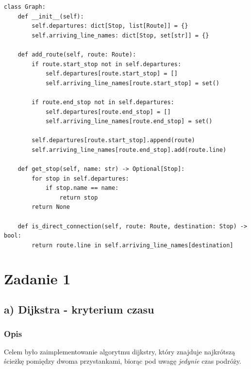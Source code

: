 \documentclass[a4paper, 12pt]{article}
\begin{document}
\begin{itemize}
\begin{lstlisting}
class Graph:
    def __init__(self):
        self.departures: dict[Stop, list[Route]] = {}
        self.arriving_line_names: dict[Stop, set[str]] = {}

    def add_route(self, route: Route):
        if route.start_stop not in self.departures:
            self.departures[route.start_stop] = []
            self.arriving_line_names[route.start_stop] = set()

        if route.end_stop not in self.departures:
            self.departures[route.end_stop] = []
            self.arriving_line_names[route.end_stop] = set()

        self.departures[route.start_stop].append(route)
        self.arriving_line_names[route.end_stop].add(route.line)

    def get_stop(self, name: str) -> Optional[Stop]:
        for stop in self.departures:
            if stop.name == name:
                return stop
        return None

    def is_direct_connection(self, route: Route, destination: Stop) -> bool:
        return route.line in self.arriving_line_names[destination]
\end{lstlisting}


    \end{itemize}



\section{Zadanie 1}
  \subsection{a) Dijkstra - kryterium czasu}
  \subsubsection{Opis} Celem było zaimplementowanie algorytmu dijkstry, który
  znajduje najkrótszą ścieżkę pomiędzy dwoma przystankami, biorąc pod uwagę \textit{jedynie}
  czas podróży. 
\end{document}
